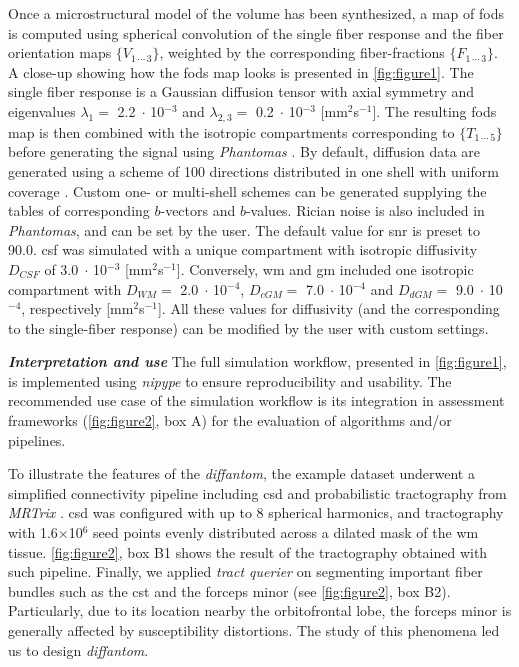 \documentclass[english]{frontiers/frontiersSCNS} %
\newcommand{\e}[1]{\ensuremath{\;\cdot\,}10\ensuremath{^{#1}}}
\begin{document}
Once a microstructural model of the volume has been synthesized, a map of \glspl{fod} is computed using spherical
  convolution of the single fiber response and the fiber orientation maps $\{V_{1\,\cdots\,3}\}$, weighted by the
  corresponding fiber-fractions $\{F_{1\,\cdots\,3}\}$.
A close-up showing how the \glspl{fod} map looks is presented in \autoref{fig:figure1}.
The single fiber response is a Gaussian diffusion tensor with axial symmetry and eigenvalues $\lambda_1=$ 2.2\e{-3}
  and $\lambda_{2,3}=$ 0.2\e{-3} [mm$^2$s$^{-1}$].
The resulting \glspl{fod} map is then combined with the isotropic compartments corresponding to $\{T_{1\,\cdots\,5}\}$
  before generating the signal using \emph{Phantomas} \citep{caruyer_Phantomas_2014}.
By default, diffusion data are generated using a scheme of 100 directions distributed in one shell with uniform
  coverage \citep{caruyer_design_2013}.
Custom one- or multi-shell schemes can be generated supplying the tables of corresponding $b$-vectors and $b$-values.
Rician noise is also included in \emph{Phantomas}, and can be set by the user.
The default value for \gls*{snr} is preset to 90.0.
\Gls*{csf} was simulated with a unique compartment with isotropic diffusivity $D_{CSF}$ of 3.0\e{-3} [mm$^2$s$^{-1}$].
Conversely, \Gls*{wm} and \gls*{gm} included one isotropic compartment with $D_{WM} =$ 2.0\e{-4}, $D_{cGM} =$ 7.0\e{-4}
  and $D_{dGM} =$ 9.0\e{-4}, respectively [mm$^2$s$^{-1}$].
All these values for diffusivity (and the corresponding to the single-fiber response) can be modified by the user with
  custom settings.


\noindent\textbf{\textit{Interpretation and use\textcolon}}
The full simulation workflow, presented in \autoref{fig:figure1}, is implemented using
  \emph{nipype} \citep{gorgolewski_nipype_2011} to ensure reproducibility and usability.
The recommended use case of the simulation workflow is its integration in assessment frameworks
  (\autoref{fig:figure2}, box A) for the evaluation of algorithms and/or pipelines.


To illustrate the features of the \emph{diffantom}, the example dataset underwent a simplified
  connectivity pipeline including \gls*{csd} and probabilistic tractography from
  \emph{MRTrix} \citep{tournier_mrtrix_2012}.
\Gls*{csd} was configured with up to 8 spherical harmonics, and tractography with 1.6$\times$10$^\text{6}$
  seed points evenly distributed across a dilated mask of the \gls*{wm} tissue.
\autoref{fig:figure2}, box B1 shows the result of the tractography obtained with such pipeline.
Finally, we applied \emph{tract querier} \citep{wassermann_on_2013} on segmenting important fiber bundles such
  as the \gls*{cst} and the forceps minor (see \autoref{fig:figure2}, box B2).
Particularly, due to its location nearby the orbitofrontal lobe, the forceps minor is generally affected by
  susceptibility distortions.
The study of this phenomena \citep{esteban_simulationbased_2014} led us to design \emph{diffantom}.
\end{document}
